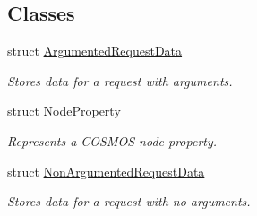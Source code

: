 \subsection*{Classes}
\begin{DoxyCompactItemize}
\item 
struct \hyperlink{structcubesat_1_1SimpleAgent_1_1ArgumentedRequestData}{Argumented\+Request\+Data}
\begin{DoxyCompactList}\small\item\em Stores data for a request with arguments. \end{DoxyCompactList}\item 
struct \hyperlink{structcubesat_1_1SimpleAgent_1_1NodeProperty}{Node\+Property}
\begin{DoxyCompactList}\small\item\em Represents a C\+O\+S\+M\+OS node property. \end{DoxyCompactList}\item 
struct \hyperlink{structcubesat_1_1SimpleAgent_1_1NonArgumentedRequestData}{Non\+Argumented\+Request\+Data}
\begin{DoxyCompactList}\small\item\em Stores data for a request with no arguments. \end{DoxyCompactList}\end{DoxyCompactItemize}
